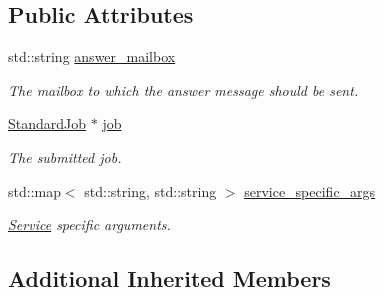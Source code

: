 \subsection*{Public Attributes}
\begin{DoxyCompactItemize}
\item 
\mbox{\label{classwrench_1_1_compute_service_submit_standard_job_request_message_a685047fc639e623f1cdb06c4c418ec6d}} 
std\+::string \hyperlink{classwrench_1_1_compute_service_submit_standard_job_request_message_a685047fc639e623f1cdb06c4c418ec6d}{answer\+\_\+mailbox}
\begin{DoxyCompactList}\small\item\em The mailbox to which the answer message should be sent. \end{DoxyCompactList}\item 
\mbox{\label{classwrench_1_1_compute_service_submit_standard_job_request_message_aa66af2c1535f9bf737551505e4b81e30}} 
\hyperlink{classwrench_1_1_standard_job}{Standard\+Job} $\ast$ \hyperlink{classwrench_1_1_compute_service_submit_standard_job_request_message_aa66af2c1535f9bf737551505e4b81e30}{job}
\begin{DoxyCompactList}\small\item\em The submitted job. \end{DoxyCompactList}\item 
\mbox{\label{classwrench_1_1_compute_service_submit_standard_job_request_message_a35f19a63653c0028c0a2da3cb94f8f17}} 
std\+::map$<$ std\+::string, std\+::string $>$ \hyperlink{classwrench_1_1_compute_service_submit_standard_job_request_message_a35f19a63653c0028c0a2da3cb94f8f17}{service\+\_\+specific\+\_\+args}
\begin{DoxyCompactList}\small\item\em \hyperlink{classwrench_1_1_service}{Service} specific arguments. \end{DoxyCompactList}\end{DoxyCompactItemize}
\subsection*{Additional Inherited Members}


